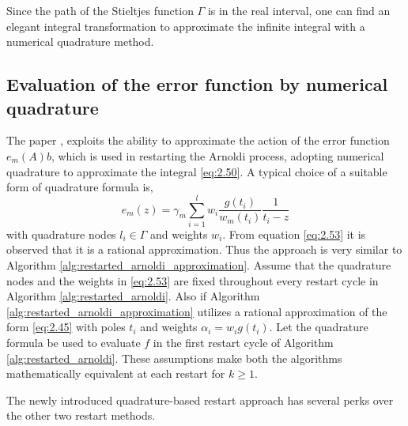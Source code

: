 Since the path of the Stieltjes function $\Gamma$ is in the real interval, one can find an elegant integral transformation to approximate the infinite integral with a numerical quadrature method.

\subsection{Evaluation of the error function by numerical quadrature}
\label{sec:eval_error_func_by_num_quad}

The paper \cite{52}, exploits the ability to approximate the action of the error function $e_{m}(A)b$, which is used in restarting the Arnoldi process, adopting numerical quadrature to approximate the integral \eqref{eq:2.50}. A typical choice of a suitable form of quadrature formula is,
\begin{equation}
    \hat{e}_{m}(z) = \gamma_{m} \sum_{i=1}^{l} w_{i}\frac{ g(t_i)}{w_{m}(t_{i})} \frac{1}{t_{i} - z}
    \label{eq:2.53}
\end{equation}
with quadrature nodes $l_{i}\in\Gamma$ and weights $w_{i}$. From equation \eqref{eq:2.53} it is observed that it is a rational approximation. Thus the approach is very similar to Algorithm \ref{alg:restarted_arnoldi_approximation}. Assume that the quadrature nodes and the weights in \eqref{eq:2.53} are fixed throughout every restart cycle in Algorithm \ref{alg:restarted_arnoldi}. Also if Algorithm \ref{alg:restarted_arnoldi_approximation} utilizes a rational approximation of the form \eqref{eq:2.45} with poles $t_{i}$ and weights $\alpha_{i}=w_{i}g(t_{i})$. Let the quadrature formula be used to evaluate $f$ in the first restart cycle of Algorithm \ref{alg:restarted_arnoldi}. These assumptions make both the algorithms mathematically equivalent at each restart for $k\geq 1$.

The newly introduced quadrature-based restart approach has several perks over the other two restart methods.

